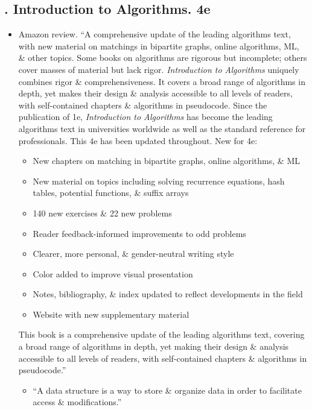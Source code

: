 \documentclass{article}
\begin{document}
\subsection{\cite{Cormen_Leiserson_Rivest_Stein_algorithm}. Introduction to Algorithms. 4e}
{}
\begin{itemize}
	\item {\sf Amazon review.} ``A comprehensive update of the leading algorithms text, with new material on matchings in bipartite graphs, online algorithms, ML, \& other topics. Some books on algorithms are rigorous but incomplete; others cover masses of material but lack rigor. {\it Introduction to Algorithms} uniquely combines rigor \& comprehensiveness. It covers a broad range of algorithms in depth, yet makes their design \& analysis accessible to all levels of readers, with self-contained chapters \& algorithms in pseudocode. Since the publication of 1e, {\it Introduction to Algorithms} has become the leading algorithms text in universities worldwide as well as the standard reference for professionals. This 4e has been updated throughout. New for 4e:
	\begin{itemize}
		\item New chapters on matching in bipartite graphs, online algorithms, \& ML
		\item New material on topics including solving recurrence equations, hash tables, potential functions, \& suffix arrays
		\item 140 new exercises \& 22 new problems
		\item Reader feedback-informed improvements to odd problems
		\item Clearer, more personal, \& gender-neutral writing style
		\item Color added to improve visual presentation
		\item Notes, bibliography, \& index updated to reflect developments in the field
		\item Website with new supplementary material
	\end{itemize}
	This book is a comprehensive update of the leading algorithms text, covering a broad range of algorithms in depth, yet making their design \& analysis accessible to all levels of readers, with self-contained chapters \& algorithms in pseudocode.''
	\begin{itemize}
		\item ``A data structure is a way to store \& organize data in order to facilitate access \& modifications.''

\end{itemize}
\end{itemize}
\end{document}
